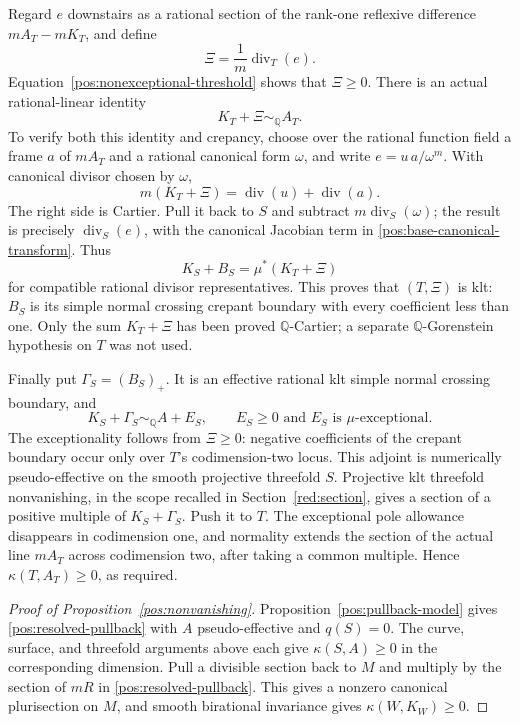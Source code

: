 \documentclass[11pt,letterpaper]{article}
\theoremstyle{definition}
\theoremstyle{remark}
\begin{document}
Regard \(e\) downstairs as a rational section of the rank-one
reflexive difference \(mA_T-mK_T\), and define
\begin{equation}\label{pos:base-boundary}
 \Xi=\frac1m\operatorname{div}_T(e).
\end{equation}
Equation~\eqref{pos:nonexceptional-threshold} shows that
\(\Xi\geq0\). There is an actual rational-linear identity
\begin{equation}\label{pos:base-adjoint}
 K_T+\Xi\sim_{\mathbb{Q}}A_T.
\end{equation}
To verify both this identity and crepancy, choose over the rational
function field a frame \(a\) of \(mA_T\) and a rational canonical
form \(\omega\), and write \(e=u\,a/\omega^m\). With canonical
divisor chosen by \(\omega\),
\[
 m(K_T+\Xi)=\operatorname{div}(u)+\operatorname{div}(a).
\]
The right side is Cartier. Pull it back to \(S\) and subtract
\(m\operatorname{div}_S(\omega)\); the result is precisely
\(\operatorname{div}_S(e)\), with the canonical Jacobian term in
\eqref{pos:base-canonical-transform}. Thus
\begin{equation}\label{pos:actual-crepant-identity}
 K_S+B_S=\mu^*(K_T+\Xi)
\end{equation}
for compatible rational divisor representatives. This proves that
\((T,\Xi)\) is klt: \(B_S\) is its simple normal crossing crepant
boundary with every coefficient less than one. Only the sum
\(K_T+\Xi\) has been proved \(\mathbb{Q}\)-Cartier; a separate
\(\mathbb{Q}\)-Gorenstein hypothesis on \(T\) was not used.

Finally put \(\Gamma_S=(B_S)_+\). It is an effective rational klt
simple normal crossing boundary, and
\[
 K_S+\Gamma_S\sim_{\mathbb{Q}}A+E_S,
 \qquad E_S\geq0\text{ and }E_S\text{ is }\mu\text{-exceptional}.
\]
The exceptionality follows from \(\Xi\geq0\): negative coefficients
of the crepant boundary occur only over \(T\)'s codimension-two
locus. This adjoint is numerically pseudo-effective on the smooth
projective threefold \(S\). Projective klt threefold nonvanishing,
in the scope recalled in Section~\ref{red:section}, gives a section
of a positive multiple of \(K_S+\Gamma_S\). Push it to \(T\).
The exceptional pole allowance disappears in codimension one, and
normality extends the section of the actual line \(mA_T\) across
codimension two, after taking a common multiple. Hence
\(\kappa(T,A_T)\geq0\), as required.

\begin{proof}[Proof of Proposition~\ref{pos:nonvanishing}]
Proposition~\ref{pos:pullback-model} gives
\eqref{pos:resolved-pullback} with \(A\) pseudo-effective and
\(q(S)=0\). The curve, surface, and threefold arguments above each
give \(\kappa(S,A)\geq0\) in the corresponding dimension. Pull a
divisible section back to \(M\) and multiply by the section of
\(mR\) in \eqref{pos:resolved-pullback}. This gives a nonzero
canonical plurisection on \(M\), and smooth birational invariance
gives \(\kappa(W,K_W)\geq0\).
\end{proof}
\end{document}

